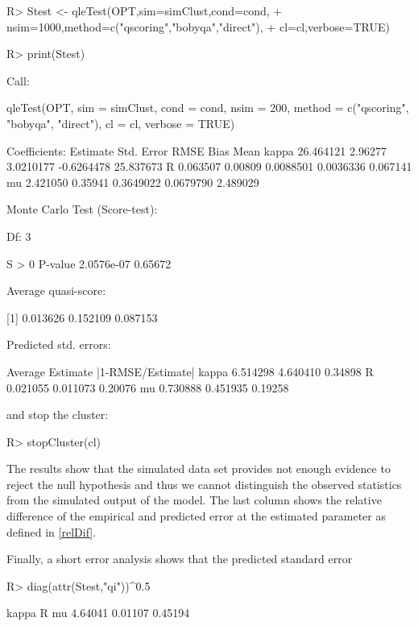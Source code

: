 \documentclass[article, nojss]{jss}
\numberwithin{equation}{section}			%
\begin{document}
\begin{Schunk}
\begin{Sinput}
R> Stest <- qleTest(OPT,sim=simClust,cond=cond, 
+   nsim=1000,method=c("qscoring","bobyqa","direct"),  
+   cl=cl,verbose=TRUE)
\end{Sinput}
\end{Schunk}
\begin{Schunk}
\begin{Sinput}
R> print(Stest)
\end{Sinput}
\begin{Soutput}
Call:

qleTest(OPT, sim = simClust, cond = cond, nsim = 200, method = c("qscoring", 
    "bobyqa", "direct"), cl = cl, verbose = TRUE)

Coefficients:
       Estimate   Std. Error  RMSE       Bias        Mean     
kappa  26.464121  2.96277     3.0210177  -0.6264478  25.837673
R       0.063507  0.00809     0.0088501   0.0036336   0.067141
mu      2.421050  0.35941     0.3649022   0.0679790   2.489029


Monte Carlo Test (Score-test):

  Df: 3 

     S > 0     P-value  
2.0576e-07     0.65672  


Average quasi-score: 

[1]  0.013626  0.152109  0.087153


Predicted std. errors: 

       Average   Estimate  |1-RMSE/Estimate|
kappa  6.514298  4.640410  0.34898          
R      0.021055  0.011073  0.20076          
mu     0.730888  0.451935  0.19258          
\end{Soutput}
\end{Schunk}
and stop the cluster:
\begin{Schunk}
\begin{Sinput}
R> stopCluster(cl)
\end{Sinput}
\end{Schunk}
The results show that the simulated data set provides not enough evidence
to reject the null hypothesis and thus we cannot distinguish the observed
statistics from the simulated output of the model. The last column shows the
relative difference of the empirical and predicted error at the estimated
parameter as defined in \eqref{relDif}.\par
%
Finally, a short error analysis shows that the predicted standard error
\begin{Schunk}
\begin{Sinput}
R> diag(attr(Stest,"qi"))^0.5
\end{Sinput}
\begin{Soutput}
  kappa       R      mu 
4.64041 0.01107 0.45194 
\end{Soutput}
\end{Schunk}
\end{document}
